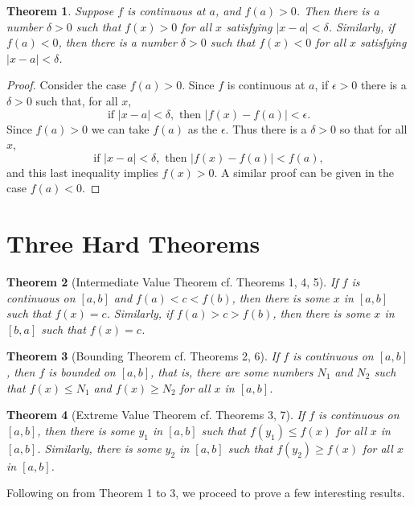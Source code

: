 \documentclass{article}
\numberwithin{definition}{subsection}
\numberwithin{lemma}{subsection}
\newtheorem{theorem}{Theorem}
\numberwithin{theorem}{subsection}
\begin{document}
\begin{theorem}
  Suppose $f$ is continuous at $a$, and $f(a) > 0$. Then there is a number
  $\delta > 0$ such that $f(x) > 0$ for all $x$ satisfying $|x - a| < \delta$.
  Similarly, if $f(a) < 0$, then there is a number $\delta > 0$ such that $f(x)
  < 0$ for all $x$ satisfying $|x - a| < \delta$.
\end{theorem}
\begin{proof}
  Consider the case $f(a) > 0$. Since $f$ is continuous at $a$, if $\epsilon >
  0$ there is a $\delta > 0$ such that, for all $x$, \[
    \text{if } |x - a| < \delta, \text{ then } |f(x) - f(a)| < \epsilon.
  \] Since $f(a) > 0$ we can take $f(a)$ as the $\epsilon$. Thus there is a
  $\delta > 0$ so that for all $x$, \[
    \text{if } |x - a| < \delta, \text{ then } |f(x) - f(a)| < f(a),
  \] and this last inequality implies $f(x) > 0$. A similar proof can be given
  in the case $f(a) < 0$.
\end{proof}

\section{Three Hard Theorems}

\begin{theorem}[Intermediate Value Theorem cf. Theorems 1, 4, 5]
  If $f$ is continuous on $[a, b]$ and $f(a) < c < f(b)$, then there is some
  $x$ in $[a, b]$ such that $f(x) = c$. Similarly, if $f(a) > c > f(b)$, then
  there is some $x$ in $[b, a]$ such that $f(x) = c$.
\end{theorem}

\begin{theorem}[Bounding Theorem cf. Theorems 2, 6]
  If $f$ is continuous on $[a, b]$, then $f$ is bounded on $[a, b]$, that
  is, there are some numbers $N_1$ and $N_2$ such that $f(x) \leq N_1$ and
  $f(x) \geq N_2$ for all $x$ in $[a, b]$.
\end{theorem}

\begin{theorem}[Extreme Value Theorem cf. Theorems 3, 7]
  If $f$ is continuous on $[a, b]$, then there is some $y_1$ in $[a, b]$ such
  that $f(y_1) \leq f(x)$ for all $x$ in $[a, b]$. Similarly, there is some
  $y_2$ in $[a, b]$ such that $f(y_2) \geq f(x)$ for all $x$ in $[a, b]$.
\end{theorem}

Following on from Theorem 1 to 3, we proceed to prove a few interesting
results.
\end{document}
